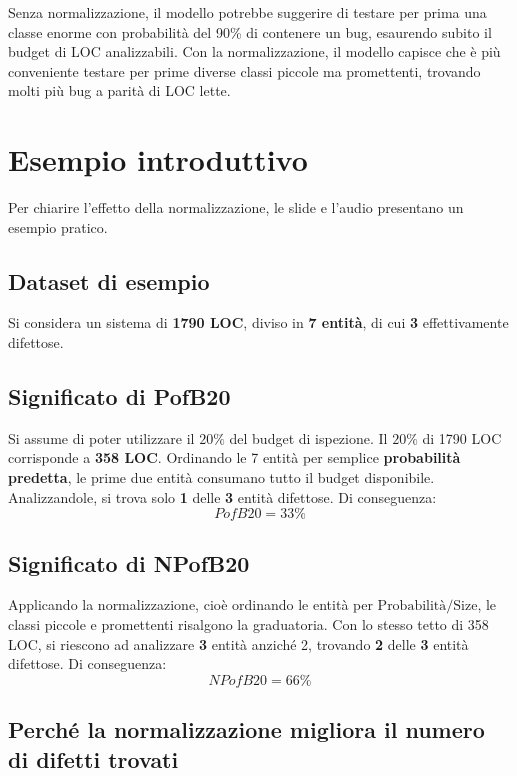 \begin{notaprof}
Senza normalizzazione, il modello potrebbe suggerire di testare per prima una classe enorme con probabilità del 90\% di contenere un bug, esaurendo subito il budget di LOC analizzabili. Con la normalizzazione, il modello capisce che è più conveniente testare per prime diverse classi piccole ma promettenti, trovando molti più bug a parità di LOC lette.
\end{notaprof}

\section{Esempio introduttivo}

Per chiarire l'effetto della normalizzazione, le slide e l'audio presentano un esempio pratico.

\subsection{Dataset di esempio}

Si considera un sistema di \textbf{1790 LOC}, diviso in \textbf{7 entità}, di cui \textbf{3} effettivamente difettose.

\subsection{Significato di PofB20}

Si assume di poter utilizzare il \(20\%\) del budget di ispezione. Il \(20\%\) di 1790 LOC corrisponde a \textbf{358 LOC}. Ordinando le 7 entità per semplice \textbf{probabilità predetta}, le prime due entità consumano tutto il budget disponibile. Analizzandole, si trova solo \textbf{1} delle \textbf{3} entità difettose. Di conseguenza:
\[
PofB20 = 33\%
\]

\subsection{Significato di NPofB20}

Applicando la normalizzazione, cioè ordinando le entità per \(\text{Probabilità}/\text{Size}\), le classi piccole e promettenti risalgono la graduatoria. Con lo stesso tetto di 358 LOC, si riescono ad analizzare \textbf{3} entità anziché 2, trovando \textbf{2} delle \textbf{3} entità difettose. Di conseguenza:
\[
NPofB20 = 66\%
\]

\subsection{Perché la normalizzazione migliora il numero di difetti trovati}


